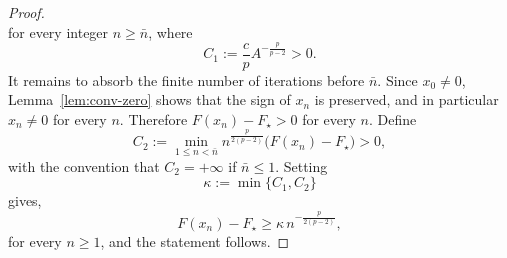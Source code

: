 \documentclass[10pt,a4paper]{amsart}
\begin{document}
\begin{proof}
\[\]
for every integer $n\geq \bar{n}$, where
\[
    C_1
    :=
    \frac{c}{p}A^{-\frac{p}{p-2}}>0.
\]
It remains to absorb the finite number of iterations before $\bar{n}$. Since \(x_0\neq0\), Lemma~\ref{lem:conv-zero} shows that the sign of \(x_n\) is preserved, and in particular \(x_n\neq0\) for every \(n\). Therefore \(F(x_n)-F_\star>0\) for every \(n\). Define
\[
    C_2
    :=
    \min_{1\le n<\bar{n}}
    n^{\frac{p}{2(p-2)}}
    \bigl(F(x_n)-F_\star\bigr) > 0,
\]
with the convention that \(C_2=+\infty\) if \(\bar{n}\le1\). Setting
\[
    \kappa:=\min\{C_1,C_2\}
\]
gives, 
\begin{equation*}
    F(x_n)-F_\star
    \ge
    \kappa\,
    n^{-\frac{p}{2(p-2)}},
\end{equation*}
for every \(n\ge1\), and the statement follows.
\end{proof}
\end{document}
